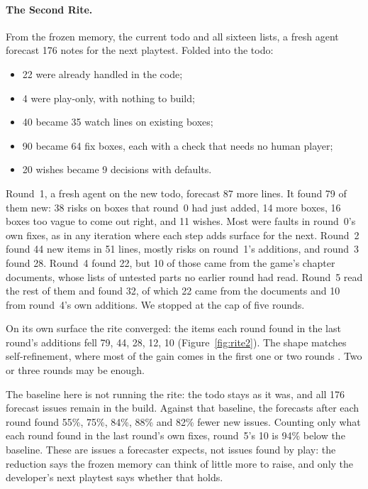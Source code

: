 \documentclass[10pt]{article}
\begin{document}
\paragraph{The Second Rite.} From the frozen memory, the current todo and all sixteen lists, a fresh agent forecast 176 notes for the next playtest. Folded into the todo:
\begin{itemize}[leftmargin=*]
  \item 22 were already handled in the code;
  \item 4 were play-only, with nothing to build;
  \item 40 became 35 watch lines on existing boxes;
  \item 90 became 64 fix boxes, each with a check that needs no human player;
  \item 20 wishes became 9 decisions with defaults.
\end{itemize}
Round~1, a fresh agent on the new todo, forecast 87 more lines. It found 79 of them new: 38 risks on boxes that round~0 had just added, 14 more boxes, 16 boxes too vague to come out right, and 11 wishes. Most were faults in round~0's own fixes, as in any iteration where each step adds surface for the next. Round~2 found 44 new items in 51 lines, mostly risks on round~1's additions, and round~3 found 28. Round~4 found 22, but 10 of those came from the game's chapter documents, whose lists of untested parts no earlier round had read. Round~5 read the rest of them and found 32, of which 22 came from the documents and 10 from round~4's own additions. We stopped at the cap of five rounds.

On its own surface the rite converged: the items each round found in the last round's additions fell 79, 44, 28, 12, 10 (Figure~\ref{fig:rite2}). The shape matches self-refinement, where most of the gain comes in the first one or two rounds \citep{madaan2023selfrefine}. Two or three rounds may be enough.

The baseline here is not running the rite: the todo stays as it was, and all 176 forecast issues remain in the build. Against that baseline, the forecasts after each round found 55\%, 75\%, 84\%, 88\% and 82\% fewer new issues. Counting only what each round found in the last round's own fixes, round~5's 10 is 94\% below the baseline. These are issues a forecaster expects, not issues found by play: the reduction says the frozen memory can think of little more to raise, and only the developer's next playtest says whether that holds.
\end{document}
